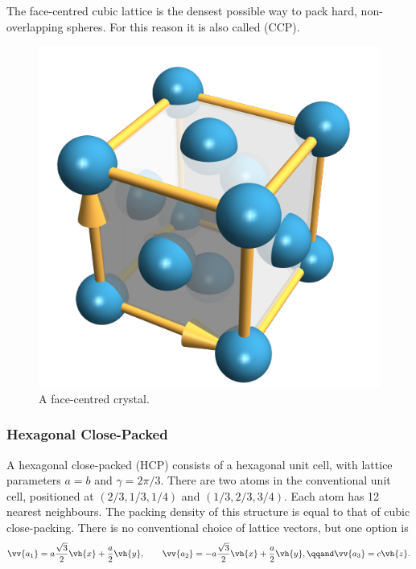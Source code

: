 \documentclass[fleqn]{NotesClass}
\begin{document}
    The face-centred cubic lattice is the densest possible way to pack hard, non-overlapping spheres.
    For this reason it is also called  (CCP).
    
    \begin{figure}
        \includegraphics{images/fcc-crystal.pdf}
        \caption[FCC crystal.]{A face-centred crystal.}
    \end{figure}
    
    \subsubsection{Hexagonal Close-Packed}
    A hexagonal close-packed (HCP) consists of a hexagonal unit cell, with lattice parameters \(a = b\) and \(\gamma = 2\pi/3\).
    There are two atoms in the conventional unit cell, positioned at \((2/3,1/3,1/4)\) and \((1/3,2/3,3/4)\).
    Each atom has 12 nearest neighbours.
    The packing density of this structure is equal to that of cubic close-packing.
    There is no conventional choice of lattice vectors, but one option is
    \begin{equation}
        \vv{a_1} = a\frac{\sqrt{3}}{2}\vh{x} + \frac{a}{2}\vh{y}, \qquad \vv{a_2} = -a\frac{\sqrt{3}}{2}\vh{x} + \frac{a}{2}\vh{y}, \qqand \vv{a_3} = c\vh{z}.
    \end{equation}
\end{document}
